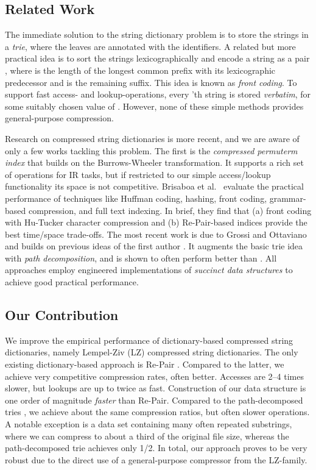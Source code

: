 \documentclass{llncs}
\begin{document}
\subsection{Related Work}
\label{sect:related}
The immediate solution to the string dictionary problem is to store the strings in a \emph{trie}, where the leaves are annotated with the identifiers.
A related but more practical idea is to sort the strings lexicographically and encode a string as a pair , where  is the length of the longest common prefix with its lexicographic predecessor and  is the remaining suffix. This idea is known as \emph{front coding}. To support fast access- and lookup-operations, every 'th string is stored \emph{verbatim}, for some suitably chosen value of . However, none of these simple methods provides general-purpose compression.

Research on compressed string dictionaries is more recent, and we are aware of only a few works tackling this problem. The first is the \emph{compressed permuterm index} \cite{ferragina10compressed} that builds on the Burrows-Wheeler transformation. It supports a rich set of operations for IR tasks, but if restricted to our simple access/lookup functionality its space is not competitive. Brisaboa et al.~\cite{brisaboa11compressed} evaluate the practical performance of techniques like Huffman coding, hashing, front coding, grammar-based compression, and full text indexing. In brief, they find that (a) front coding with Hu-Tucker character compression and (b) Re-Pair-based indices provide the best time/space trade-offs.
The most recent work is due to Grossi and Ottaviano \cite{grossi12fast} and builds on previous ideas of the first author \cite{ferragina08searching}. It augments the basic trie idea with \emph{path decomposition}, and is shown to often perform better than \cite{brisaboa11compressed}. All approaches employ engineered implementations of \emph{succinct data structures} to achieve good practical performance.

\subsection{Our Contribution}
We improve the empirical performance of dictionary-based compressed string dictionaries, namely Lempel-Ziv (LZ) compressed string dictionaries. The only existing dictionary-based approach is Re-Pair \cite{brisaboa11compressed}. Compared to the latter, we achieve very competitive compression rates, often better. Accesses are 2--4 times slower, but lookups are up to twice as fast. Construction of our data structure is one order of magnitude \emph{faster} than Re-Pair. Compared to the path-decomposed tries \cite{grossi12fast}, we achieve about the same compression ratios, but often slower operations. A notable exception is a data set containing many often repeated substrings, where we can compress to about a third of the original file size, whereas the path-decomposed trie achieves only 1/2. In total, our approach proves to be very robust due to the direct use of a general-purpose compressor from the LZ-family.
\end{document}
